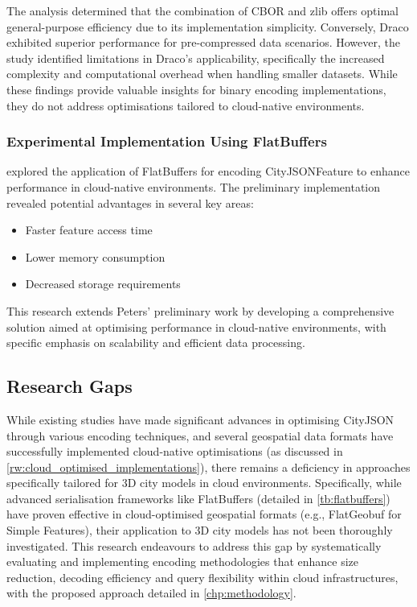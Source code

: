 The analysis determined that the combination of CBOR and zlib offers optimal general-purpose efficiency due to its implementation simplicity. Conversely, Draco exhibited superior performance for pre-compressed data scenarios. However, the study identified limitations in Draco's applicability, specifically the increased complexity and computational overhead when handling smaller datasets. While these findings provide valuable insights for binary encoding implementations, they do not address optimisations tailored to cloud-native environments.

\subsubsection{Experimental Implementation Using FlatBuffers}
\label{rw:cityjson_enhancements:performance:flatbuffers}
\citet{ravi_peters_2024_citybuf} explored the application of FlatBuffers \citep{flatbuffers} for encoding CityJSONFeature to enhance performance in cloud-native environments. The preliminary implementation revealed potential advantages in several key areas:

\begin{itemize}
  \item Faster feature access time
  \item Lower memory consumption
  \item Decreased storage requirements
\end{itemize}

This research extends Peters' preliminary work by developing a comprehensive solution aimed at optimising performance in cloud-native environments, with specific emphasis on scalability and efficient data processing.

\subsection{Research Gaps}
\label{rw:research_gaps}
While existing studies have made significant advances in optimising CityJSON through various encoding techniques, and several geospatial data formats have successfully implemented cloud-native optimisations (as discussed in \autoref{rw:cloud_optimised_implementations}), there remains a deficiency in approaches specifically tailored for 3D city models in cloud environments. Specifically, while advanced serialisation frameworks like FlatBuffers (detailed in \autoref{tb:flatbuffers}) have proven effective in cloud-optimised geospatial formats (e.g., FlatGeobuf for Simple Features), their application to 3D city models has not been thoroughly investigated. This research endeavours to address this gap by systematically evaluating and implementing encoding methodologies that enhance size reduction, decoding efficiency and query flexibility within cloud infrastructures, with the proposed approach detailed in \autoref{chp:methodology}.

